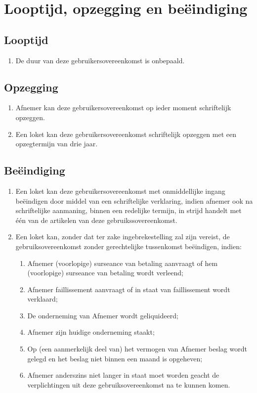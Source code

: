 \documentclass[10pt, a4paper]{article}
\begin{document}
\section{Looptijd, opzegging en beëindiging}
\subsection*{Looptijd}
\begin{enumerate}
   \item De duur van deze gebruikersovereenkomst is onbepaald.
\end{enumerate}

\subsection*{Opzegging}
\begin{enumerate}
   \item Afnemer kan deze gebruikersovereenkomst op ieder moment schriftelijk opzeggen.
   \item Een loket kan deze gebruikersovereenkomst schriftelijk opzeggen met een opzegtermijn van drie jaar.
\end{enumerate}

\subsection*{Beëindiging}
\begin{enumerate}
   \item Een loket kan deze gebruikersovereenkomst met onmiddellijke ingang beëindigen door middel van een schriftelijke verklaring, indien afnemer ook na schriftelijke aanmaning, binnen een redelijke termijn, in strijd handelt met één van de artikelen van deze gebruikssovereenkomst.
   \item Een loket kan, zonder dat ter zake ingebrekestelling zal zijn vereist, de gebruiksovereenkomst zonder gerechtelijke tussenkomst beëindigen, indien:
      \begin{enumerate}
      \item Afnemer (voorlopige) surseance van betaling aanvraagt of hem (voorlopige) surseance van betaling wordt verleend;
      \item Afnemer faillissement aanvraagt of in staat van faillissement wordt verklaard;
      \item De onderneming van Afnemer wordt geliquideerd;
      \item Afnemer zijn huidige onderneming staakt;
      \item Op (een aanmerkelijk deel van) het vermogen van Afnemer beslag wordt gelegd en het beslag niet binnen een maand is opgeheven;
      \item Afnemer anderszins niet langer in staat moet worden geacht de verplichtingen uit deze gebruiksovereenkomst na te kunnen komen.
      \end{enumerate}
\end{enumerate}
\newpage
\end{document}
